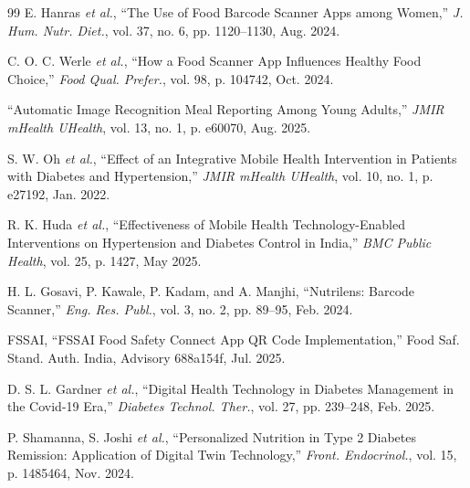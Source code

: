 \documentclass[conference]{IEEEtran}
\begin{document}
\begin{thebibliography}{99}
    E. Hanras \textit{et al.}, ``The Use of Food Barcode Scanner Apps among Women,'' \textit{J. Hum. Nutr. Diet.}, vol. 37, no. 6, pp. 1120--1130, Aug. 2024.
    \vspace{5pt}

    C. O. C. Werle \textit{et al.}, ``How a Food Scanner App Influences Healthy Food Choice,'' \textit{Food Qual. Prefer.}, vol. 98, p. 104742, Oct. 2024.
    \vspace{5pt}

    ``Automatic Image Recognition Meal Reporting Among Young Adults,'' \textit{JMIR mHealth UHealth}, vol. 13, no. 1, p. e60070, Aug. 2025.
    \vspace{5pt}

    S. W. Oh \textit{et al.}, ``Effect of an Integrative Mobile Health Intervention in Patients with Diabetes and Hypertension,'' \textit{JMIR mHealth UHealth}, vol. 10, no. 1, p. e27192, Jan. 2022.
    \vspace{5pt}

    R. K. Huda \textit{et al.}, ``Effectiveness of Mobile Health Technology-Enabled Interventions on Hypertension and Diabetes Control in India,'' \textit{BMC Public Health}, vol. 25, p. 1427, May 2025.
    \vspace{5pt}

    H. L. Gosavi, P. Kawale, P. Kadam, and A. Manjhi, ``Nutrilens: Barcode Scanner,'' \textit{Eng. Res. Publ.}, vol. 3, no. 2, pp. 89--95, Feb. 2024.
    \vspace{5pt}

    FSSAI, ``FSSAI Food Safety Connect App QR Code Implementation,'' Food Saf. Stand. Auth. India, Advisory 688a154f, Jul. 2025.
    \vspace{5pt}

    D. S. L. Gardner \textit{et al.}, ``Digital Health Technology in Diabetes Management in the Covid-19 Era,'' \textit{Diabetes Technol. Ther.}, vol. 27, pp. 239--248, Feb. 2025.
    \vspace{5pt}

    P. Shamanna, S. Joshi \textit{et al.}, ``Personalized Nutrition in Type 2 Diabetes Remission: Application of Digital Twin Technology,'' \textit{Front. Endocrinol.}, vol. 15, p. 1485464, Nov. 2024.
    \vspace{5pt}


\end{thebibliography}
\end{document}
